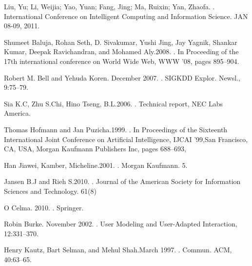 \begin{thebibliography}{10}
Liu, Yu; Li, Weijia; Yao, Yuan; Fang, Jing; Ma, Ruixin; Yan, Zhaofa.
.
\newblock International Conference on Intelligent Computing and Information Science. JAN 08-09, 2011.

Shumeet Baluja, Rohan Seth, D. Sivakumar, Yushi Jing, Jay Yagnik, Shankar Kumar, Deepak Ravichandran, and Mohamed Aly.2008.
.
\newblock In Proceeding of the 17th international conference on World Wide Web, WWW ’08, pages 895–904.

Robert M. Bell and Yehuda Koren. December 2007.
.
\newblock SIGKDD Explor. Newsl., 9:75–79.

Sia K.C, Zhu S.Chi, Hino Tseng, B.L.2006.
.
\newblock Technical report, NEC Labs America. 

Thomas Hofmann and Jan Puzicha.1999. 
.
\newblock In Proceedings of the Sixteenth International Joint Conference on Artificial Intelligence, IJCAI ’99,San Francisco, CA, USA, Morgan Kaufmann Publishers Inc, pages 688–693, 

Han Jiawei, Kamber, Micheline.2001.
.
\newblock Morgan Kaufmann. 5.

Jansen B.J and Rieh S.2010.
.
\newblock Journal of the American Society for Information Sciences and Technology. 61(8)

O Celma. 2010.
.
\newblock Springer. 

Robin Burke. November 2002.
.
\newblock User Modeling and User-Adapted Interaction, 12:331–370.

Henry Kautz, Bart Selman, and Mehul Shah.March 1997.
.
\newblock Commun. ACM, 40:63–65.


\end{thebibliography}
